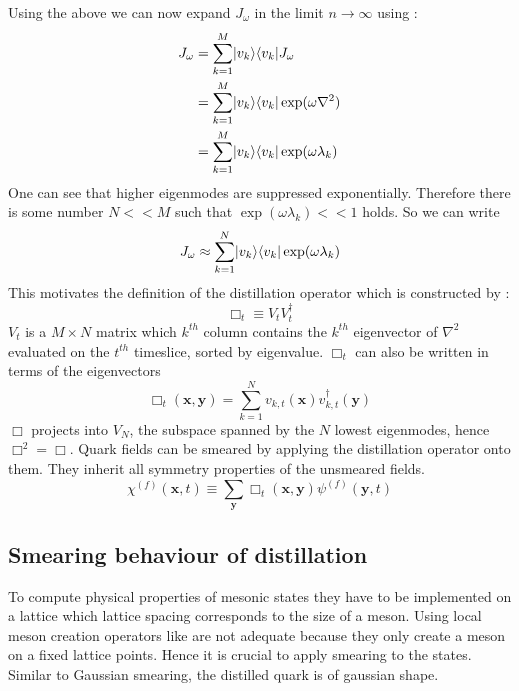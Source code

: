    \noindent
    Using the above we can now expand $J_\omega$ in the limit $n\rightarrow\infty$ using :
    \begin{equation}
        \begin{aligned}
            J_\omega &= \sum^M_{k=1}\lvert v_k\rangle\langle v_k\rvert J_\omega\\
            &= \sum^M_{k=1}\lvert v_k\rangle\langle v_k\rvert \exp(\omega\nabla^2)\\
            &= \sum^M_{k=1}\lvert v_k\rangle\langle v_k\rvert \exp(\omega\lambda_k)
        \end{aligned}
    \end{equation}
    One can see that higher eigenmodes are suppressed exponentially. Therefore there is some number $N<<M$ such that $\exp(\omega\lambda_k) << 1$ holds. So we can write
    \begin{equation}
        J_\omega \approx \sum^N_{k=1}\lvert v_k\rangle\langle v_k\rvert \exp(\omega\lambda_k)
    \end{equation}
    This motivates the definition of the distillation operator which is constructed by \cite{distillation_paper}:
    \begin{equation}
        \Box_t \equiv V_tV_t^\dagger
    \end{equation}
    $V_t$ is a $M \times N$ matrix which $k^{th}$ column contains the $k^{th}$ eigenvector of $\nabla^2$ evaluated on the $t^{th}$ timeslice, sorted by eigenvalue. $\Box_t$ can also be written in terms of the eigenvectors
    \begin{equation}\label{distillation_operator}
        \Box_{t}(\textbf{x},\textbf{y}) = \sum^N_{k=1}v_{k,t}(\textbf{x})v^\dagger_{k,t}(\textbf{y})
    \end{equation}
    $\Box$ projects into $V_N$, the subspace spanned by the $N$ lowest eigenmodes, hence $\Box^2 = \Box$. Quark fields can be smeared by applying the distillation operator onto them. They inherit all symmetry properties of the unsmeared fields.
    \begin{equation}
        \chi^{(f)}(\textbf{x},t) \equiv \sum_{\textbf{y}} \Box_t(\textbf{x},\textbf{y}) \psi^{(f)}(\textbf{y},t)
    \end{equation}
    
\subsection{Smearing behaviour of distillation}
    To compute physical properties of mesonic states they have to be implemented on a lattice which lattice spacing corresponds to the size of a meson. Using local meson creation operators like  are not adequate because they only create a meson on a fixed lattice points. Hence it is crucial to apply smearing to the states. Similar to Gaussian smearing, the distilled quark is of gaussian shape.
    
